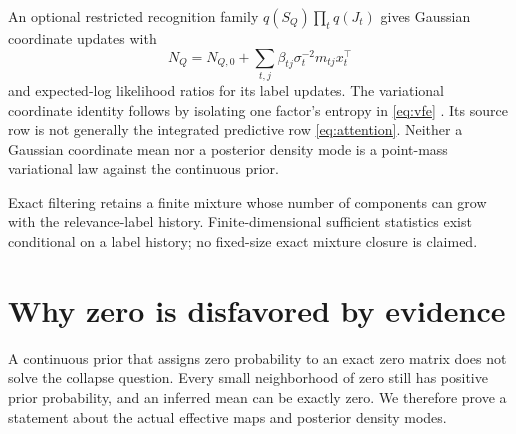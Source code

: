 \documentclass[11pt]{article}
\theoremstyle{definition}
\theoremstyle{remark}
\newcommand{\SQ}{S_{Q}}
\begin{document}
An optional restricted recognition family \(q(\SQ)\prod_tq(J_t)\) gives Gaussian coordinate updates with
\[
N_Q=N_{Q,0}+\sum_{t,j}\beta_{tj}\sigma_t^{-2}m_{tj}x_t^\top
\]
and expected-log likelihood ratios for its label updates. The variational coordinate identity follows by isolating one factor's entropy in \eqref{eq:vfe} \citep{Blei2017}. Its source row is not generally the integrated predictive row \eqref{eq:attention}. Neither a Gaussian coordinate mean nor a posterior density mode is a point-mass variational law against the continuous prior.

Exact filtering retains a finite mixture whose number of components can grow with the relevance-label history. Finite-dimensional sufficient statistics exist conditional on a label history; no fixed-size exact mixture closure is claimed.

\section{Why zero is disfavored by evidence}

A continuous prior that assigns zero probability to an exact zero matrix does not solve the collapse question. Every small neighborhood of zero still has positive prior probability, and an inferred mean can be exactly zero. We therefore prove a statement about the actual effective maps and posterior density modes.
\end{document}
